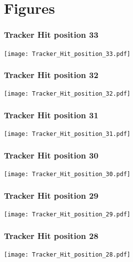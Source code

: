 \documentclass[slidestop,compress,mathserif]{beamer}
\begin{document}
\section{Figures}
\begin{frame}\frametitle{Tracker Hit position 33}
	 \texttt{[image: Tracker\_Hit\_position\_33.pdf]}
\end{frame}
\begin{frame}\frametitle{Tracker Hit position 32}
	 \texttt{[image: Tracker\_Hit\_position\_32.pdf]}
\end{frame}
\begin{frame}\frametitle{Tracker Hit position 31}
	 \texttt{[image: Tracker\_Hit\_position\_31.pdf]}
\end{frame}
\begin{frame}\frametitle{Tracker Hit position 30}
	 \texttt{[image: Tracker\_Hit\_position\_30.pdf]}
\end{frame}
\begin{frame}\frametitle{Tracker Hit position 29}
	 \texttt{[image: Tracker\_Hit\_position\_29.pdf]}
\end{frame}
\begin{frame}\frametitle{Tracker Hit position 28}
	 \texttt{[image: Tracker\_Hit\_position\_28.pdf]}
\end{frame}
\end{document}
